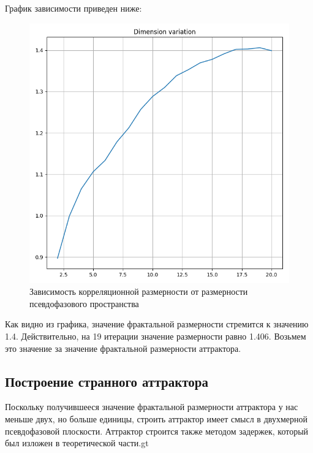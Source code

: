\documentclass[12pt, oneside, a4paper]{article}
\begin{document}
График зависимости приведен ниже:
\begin{figure}[!h]
    \caption {Зависимость корреляционной размерности от размерности псевдофазового пространства}
    \centerline{\includegraphics[scale = 0.8666]{../results/dim.png}}
\end{figure}

Как видно из графика, значение фрактальной размерности стремится к значению 1.4. Действительно, на 19 итерации значение размерности равно 1.406. Возьмем это значение за значение фрактальной размерности аттрактора.

\subsection{Построение странного аттрактора}
Поскольку получившееся значение фрактальной размерности аттрактора у нас 
меньше двух, но больше единицы, строить аттрактор имеет смысл в 
двухмерной псевдофазовой плоскости. Аттрактор строится также методом 
задержек, который был изложен в теоретической части.gt
\end{document}
